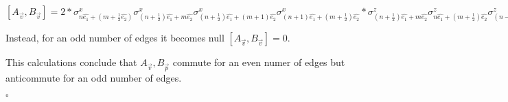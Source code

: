 \documentclass[12pt]{report}
\begin{document}
\begin{minipage}{1\textwidth}
	    \begin{center}
	    	
	    	$[A_{\vec{v}},B_{\vec{v}}] = 2 *
	    	\sigma^x_{n\hat{e_1} + (m+\frac{1}{2}\hat{e_2})} \sigma^x_{(n+ \frac{1}{2})\hat{e_1} + m\hat{e_2}} \sigma^x_{(n+ \frac{1}{2})\hat{e_1} + (m + 1)\hat{e_2}} \sigma^x_{(n+ 1)\hat{e_1} + (m + \frac{1}{2})\hat{e_2}}*
	    	\sigma^z_{(n+\frac{1}{2})\hat{e_1} + m\hat{e_2}} \sigma^z_{n\hat{e_1}+(m+\frac{1}{2})\hat{e_2}} \sigma^z_{(n-\frac{1}{2})\hat{e_1} + m\hat{e_2}} \sigma^z_{n\hat{e_1}+(m-\frac{1}{2})\hat{e_2}} $ 	\newline 
	    
	    	
	    \end{center}
	    Instead, for an odd number of edges it becomes null $[A_{\vec{v}},B_{\vec{v}}]=0$.\newline
	    
	    This calculations conclude that $A_{\vec{v}},B_{\vec{p}}$ commute for an even numer of edges but anticommute for an odd number of edges.\newline
		
		\hfill $\square$\newline
		
		
	\end{minipage}
	
	
	
\end{document}
